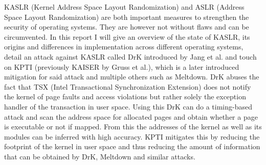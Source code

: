 KASLR (Kernel Address Space Layout Randomization) and ASLR (Address Space Layout Randomization) are both important measures to strengthen the security of operating systems.
They are however not without flaws and can be circumvented.
In this report I will give an overview of the state of KASLR, its origins and differences in implementation across different operating systems, detail an attack against KASLR called DrK introduced by Jang et al. and touch on KPTI (previously KAISER by Gruss et al.), which is a later introduced mitigation for said attack and multiple others such as Meltdown.
DrK abuses the fact that TSX (Intel Transactional Synchronization Extension) does not notify the kernel of page faults and access violations but rather solely the exception handler of the transaction in user space. Using this DrK can do a timing-based attack and scan the address space for allocated pages and obtain whether a page is executable or not if mapped.
From this the addresses of the kernel as well as its modules can be inferred with high accuracy.
KPTI mitigates this by reducing the footprint of the kernel in user space and thus reducing the amount of information that can be obtained by DrK, Meltdown and similar attacks.

